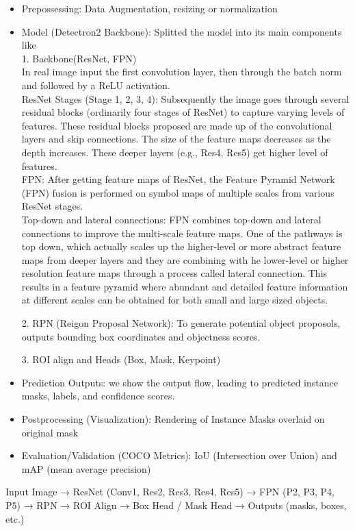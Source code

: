 \documentclass[conference]{IEEEtran}
\begin{document}
\begin{itemize}
    \item Prepossessing: Data Augmentation, resizing or normalization
    \item Model (Detectron2 Backbone): Splitted the model into its main components like
    \\1. Backbone(ResNet, FPN)
    \\In real image input the first convolution layer, then through the batch norm and followed by a ReLU activation.\\
    ResNet Stages (Stage 1, 2, 3, 4): Subsequently the image goes through several residual blocks (ordinarily four stages of ResNet) to capture varying levels of features. These residual blocks proposed are made up of the convolutional layers and skip connections. The size of the feature maps decreases as the depth increases. These deeper layers (e.g., Res4, Res5) get higher level of features.\\
    FPN: After getting feature maps of ResNet, the Feature Pyramid Network (FPN) fusion is performed on symbol maps of multiple scales from various ResNet stages.\\
    Top-down and lateral connections: FPN combines top-down and lateral connections to improve the multi-scale feature maps. One of the pathways is top down, which actually scales up the higher-level or more abstract feature maps from deeper layers and they are combining with he lower-level or higher resolution feature maps through a process called lateral connection. This results in a feature pyramid where abundant and detailed feature information at different scales can be obtained for both small and large sized objects.

    2. RPN (Reigon Proposal Network): To generate potential object proposols, outputs bounding box coordinates and objectness scores.

    3. ROI align and Heads (Box, Mask, Keypoint)\\
    \item Prediction Outputs: we show the output flow, leading to predicted instance masks, labels, and confidence scores.
    \item Postprocessing (Visualization): Rendering of Instance Masks overlaid on original mask
    \item Evaluation/Validation (COCO Metrics): IoU (Intersection over Union) and mAP (mean average precision) 
\end{itemize}

Input Image → ResNet (Conv1, Res2, Res3, Res4, Res5) → FPN (P2, P3, P4, P5) → RPN → ROI Align → Box Head / Mask Head → Outputs (masks, boxes, etc.)
\end{document}
